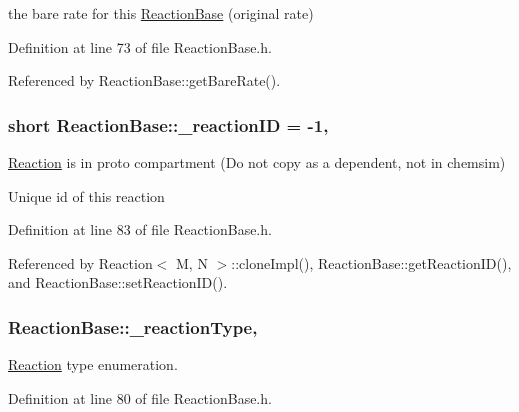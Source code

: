 the bare rate for this \hyperlink{classReactionBase}{Reaction\+Base} (original rate) 



Definition at line 73 of file Reaction\+Base.\+h.



Referenced by Reaction\+Base\+::get\+Bare\+Rate().

\hypertarget{classReactionBase_a36d0a7b500e3df2944eb3ff61fa84617}{
\subsubsection[{\+\_\+reaction\+I\+D}]{\setlength{\rightskip}{0pt plus 5cm}short Reaction\+Base\+::\+\_\+reaction\+I\+D = -\/1\hspace{0.3cm}{\ttfamily [protected]}, {\ttfamily [inherited]}}}\label{classReactionBase_a36d0a7b500e3df2944eb3ff61fa84617}


\hyperlink{classReaction}{Reaction} is in proto compartment (Do not copy as a dependent, not in chemsim) 

Unique id of this reaction 

Definition at line 83 of file Reaction\+Base.\+h.



Referenced by Reaction$<$ M, N $>$\+::clone\+Impl(), Reaction\+Base\+::get\+Reaction\+I\+D(), and Reaction\+Base\+::set\+Reaction\+I\+D().

\hypertarget{classReactionBase_a367c9de5f4d7d589d846c0201e9ca273}{
\subsubsection[{\+\_\+reaction\+Type}]{ Reaction\+Base\+::\+\_\+reaction\+Type\hspace{0.3cm}{\ttfamily [protected]}, {\ttfamily [inherited]}}}\label{classReactionBase_a367c9de5f4d7d589d846c0201e9ca273}


\hyperlink{classReaction}{Reaction} type enumeration. 



Definition at line 80 of file Reaction\+Base.\+h.



